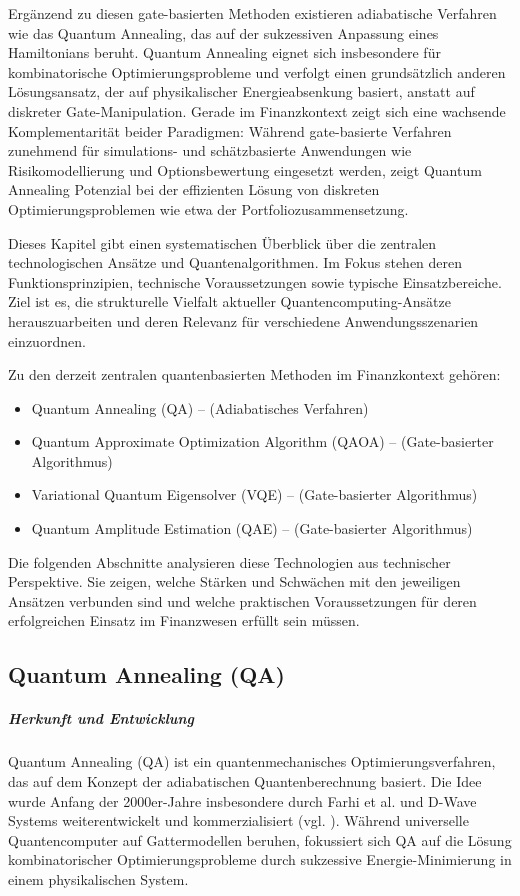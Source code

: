 Ergänzend zu diesen gate-basierten Methoden existieren adiabatische Verfahren wie das Quantum Annealing, das auf der sukzessiven Anpassung eines Hamiltonians beruht. Quantum Annealing eignet sich insbesondere für kombinatorische Optimierungsprobleme und verfolgt einen grundsätzlich anderen Lösungsansatz, der auf physikalischer Energieabsenkung basiert, anstatt auf diskreter Gate-Manipulation. Gerade im Finanzkontext zeigt sich eine wachsende Komplementarität beider Paradigmen: Während gate-basierte Verfahren zunehmend für simulations- und schätzbasierte Anwendungen wie Risikomodellierung und Optionsbewertung eingesetzt werden, zeigt Quantum Annealing Potenzial bei der effizienten Lösung von diskreten Optimierungsproblemen wie etwa der Portfoliozusammensetzung.

Dieses Kapitel gibt einen systematischen Überblick über die zentralen technologischen Ansätze und Quantenalgorithmen. Im Fokus stehen deren Funktionsprinzipien, technische Voraussetzungen sowie typische Einsatzbereiche. Ziel ist es, die strukturelle Vielfalt aktueller Quantencomputing-Ansätze herauszuarbeiten und deren Relevanz für verschiedene Anwendungsszenarien einzuordnen.

Zu den derzeit zentralen quantenbasierten Methoden im Finanzkontext gehören:

\begin{itemize}
\item Quantum Annealing (QA) – (Adiabatisches Verfahren)
\item Quantum Approximate Optimization Algorithm (QAOA) – (Gate-basierter Algorithmus)
\item Variational Quantum Eigensolver (VQE) – (Gate-basierter Algorithmus)
\item Quantum Amplitude Estimation (QAE) – (Gate-basierter Algorithmus)
\end{itemize}

Die folgenden Abschnitte analysieren diese Technologien aus technischer Perspektive. Sie zeigen, welche Stärken und Schwächen mit den jeweiligen Ansätzen verbunden sind und welche praktischen Voraussetzungen für deren erfolgreichen Einsatz im Finanzwesen erfüllt sein müssen.

\subsection{Quantum Annealing (QA)}

\subparagraph{Herkunft und Entwicklung}
Quantum Annealing (QA) ist ein quantenmechanisches Optimierungsverfahren, das auf dem Konzept der adiabatischen Quantenberechnung basiert. Die Idee wurde Anfang der 2000er-Jahre insbesondere durch Farhi et al. und D-Wave Systems weiterentwickelt und kommerzialisiert (vgl. \cite{orus_quantum_2019}). Während universelle Quantencomputer auf Gattermodellen beruhen, fokussiert sich QA auf die Lösung kombinatorischer Optimierungsprobleme durch sukzessive Energie-Minimierung in einem physikalischen System.

